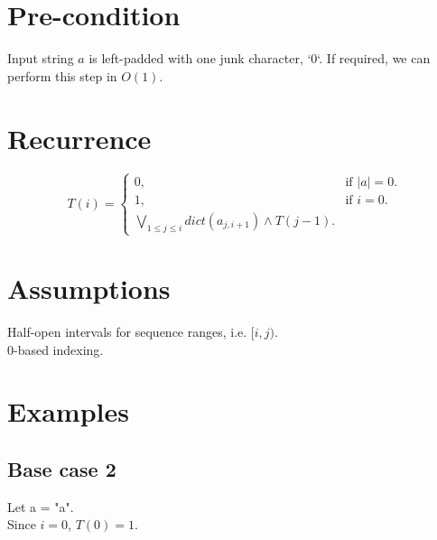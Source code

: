 \documentclass{article}
\begin{document}
	\section{Pre-condition}
		Input string $a$ is left-padded with one junk character, `0`.
		If required, we can perform this step in $O(1)$.
	
	\section{Recurrence}
		\begin{equation}
			T(i)=\begin{cases}
				0, & \text{if $|a|=0$}.\\
				1, & \text{if $i=0$}.\\
				\underset{1 \leq j \leq i}{\bigvee} dict(a_{j,i+1}) \wedge T(j-1).
			\end{cases}
		\end{equation}
	\section{Assumptions}
	Half-open intervals for sequence ranges, i.e. $[i,j)$.\\
	0-based indexing.
	
	\section{Examples}	
		\subsection{Base case 2}
			Let a = "a".\\
			Since $i=0$, $T(0) = 1$.
			
\end{document}

